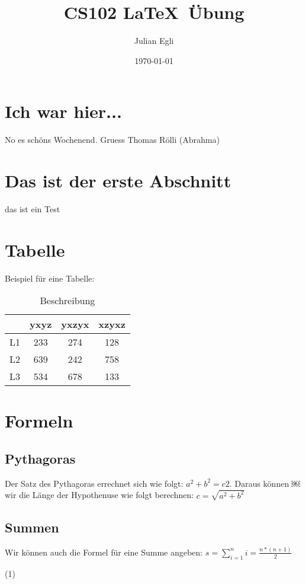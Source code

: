 \documentclass{article}
\date{\today}
\author{Julian Egli}
\title{CS102 \LaTeX  \ \"Ubung}
\begin{document}
\maketitle

\section{Ich war hier...}
No es sch\"ons Wochenend. Gruess Thomas R\"olli (Abrahma)

\section{Das ist der erste Abschnitt}
das ist ein Test

\section{Tabelle}
Beispiel f\"ur eine Tabelle:
\begin{table}[h]
\centering
\begin{tabular}{c|c|c|c}
 & yxyz & yxzyx & xzyxz \\
\hline L1  & 233 & 274 & 128 \\
L2 & 639 & 242 & 758 \\
L3 & 534 & 678 & 133 \\
\end{tabular}
\caption{Beschreibung}
\end{table}

\section{Formeln}
\subsection{Pythagoras}
Der Satz des Pythagoras errechnet sich wie folgt: $a^2 + b^2 = c2$. Daraus k\"onnen
￼wir die L\"ange der Hypothenuse wie folgt berechnen: $c = \sqrt{a^2 + b^2}$
\subsection{Summen}
Wir k\"onnen auch die Formel f\"ur eine Summe angeben:
\newline
\center $s = \sum\limits_{i=1}^{n}i = \frac{n * (n + 1)}{2}$\begin{flushright} (1) \end{flushright}
\end{document}
